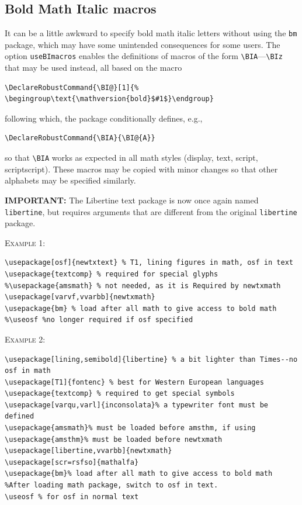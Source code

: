 \documentclass[\fsc]{article}
\theoremstyle{oldplain}
\theoremstyle{plain}
\begin{document}
\subsection{Bold Math Italic macros}
It can be a little awkward to specify bold math italic letters without using the \texttt{bm} package, which may have some unintended consequences for some users. The option \texttt{useBImacros} enables the definitions of macros of the form \verb|\BIA|---\verb|\BIz| that may be used instead, all based on the macro 
\begin{verbatim}
\DeclareRobustCommand{\BI@}[1]{%
\begingroup\text{\mathversion{bold}$#1$}\endgroup}
\end{verbatim}
following which, the package conditionally defines, e.g.,
\begin{verbatim}
\DeclareRobustCommand{\BIA}{\BI@{A}}
\end{verbatim}
so that \verb|\BIA| works as expected in all math styles (display, text, script, scriptscript). These macros may be copied with minor changes so that other alphabets may be specified similarly.

\textbf{IMPORTANT:} The Libertine text package is now once again named {\tt libertine}, but requires arguments that are different from the original {\tt libertine} package.

\textsc{Example 1:}
\begin{verbatim}
\usepackage[osf]{newtxtext} % T1, lining figures in math, osf in text
\usepackage{textcomp} % required for special glyphs
%\usepackage{amsmath} % not needed, as it is Required by newtxmath
\usepackage[varvf,vvarbb]{newtxmath}
\usepackage{bm} % load after all math to give access to bold math
%\useosf %no longer required if osf specified
\end{verbatim}
\textsc{Example 2:}
\begin{verbatim}
\usepackage[lining,semibold]{libertine} % a bit lighter than Times--no osf in math
\usepackage[T1]{fontenc} % best for Western European languages
\usepackage{textcomp} % required to get special symbols
\usepackage[varqu,varl]{inconsolata}% a typewriter font must be defined
\usepackage{amsmath}% must be loaded before amsthm, if using
\usepackage{amsthm}% must be loaded before newtxmath
\usepackage[libertine,vvarbb]{newtxmath}
\usepackage[scr=rsfso]{mathalfa}
\usepackage{bm}% load after all math to give access to bold math
%After loading math package, switch to osf in text.
\useosf % for osf in normal text
\end{verbatim}
\end{document}
